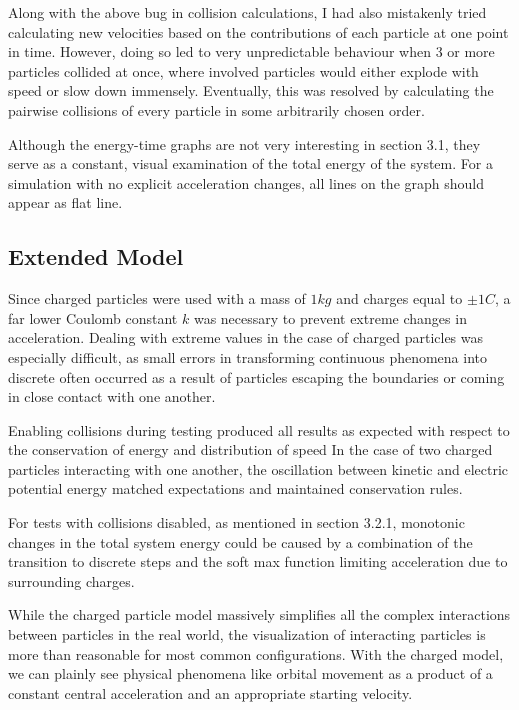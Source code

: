 \documentclass{article}
\begin{document}
Along with the above bug in collision calculations, I had also mistakenly tried calculating new velocities
based on the contributions of each particle at one point in time.
However, doing so led to very unpredictable behaviour when 3 or more particles collided at once, where
involved particles would either explode with speed or slow down immensely.
Eventually, this was resolved by calculating the pairwise collisions of every particle in some arbitrarily chosen order.

Although the energy-time graphs are not very interesting in section 3.1,
they serve as a constant, visual examination of the total energy of the system.
For a simulation with no explicit acceleration changes, all lines on the graph should appear as flat line.

\subsection{Extended Model}
Since charged particles were used with a mass of $1 kg$ and charges equal to $\pm 1 C$,
a far lower Coulomb constant $k$ was necessary to prevent extreme changes in acceleration.
Dealing with extreme values in the case of charged particles was especially difficult,
as small errors in transforming continuous phenomena into discrete often occurred as a result of
particles escaping the boundaries or coming in close contact with one another.

Enabling collisions during testing produced all results as expected
with respect to the conservation of energy and distribution of speed
In the case of two charged particles interacting with one another,
the oscillation between kinetic and electric potential energy matched
expectations and maintained conservation rules.

For tests with collisions disabled, as mentioned in section 3.2.1,
monotonic changes in the total system energy could be caused
by a combination of the transition to discrete steps and
the soft max function limiting acceleration due to surrounding charges.

While the charged particle model massively simplifies all the complex interactions between particles in the real world,
the visualization of interacting particles is more than reasonable for most common configurations.
With the charged model, we can plainly see physical phenomena like orbital movement as a product of a constant central acceleration
and an appropriate starting velocity.
\end{document}
